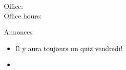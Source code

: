 \documentclass{beamer}
\subtitle[Adjectifs prénominaux au singulier]{Les adjectifs prénominaux au singulier}
\begin{document}
  \begin{frame}
    \titlepage
    \tiny{Office: \\
          Office hours: }
  \end{frame}

  \begin{frame}{Annonces}
    \begin{itemize}
      \item Il y aura toujours un quiz vendredi!
      \item[] 
    \end{itemize}
  \end{frame}

\end{document}
